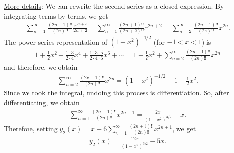 \documentclass[12pt]{article}
\begin{document}
	
	\underline{More details}: We can rewrite the second series as a closed expression. By integrating terms-by-terms, we get
		\begin{align*}
		\sum_{n = 1}^\infty \frac{(2n + 1)!!}{(2n)!!} \frac{x^{2n + 2}}{2n + 2} = \sum_{n = 1}^\infty \frac{(2n + 1)!!}{(2n + 2)!!} x^{2n + 2} = \sum_{n = 2}^\infty \frac{(2n - 1)!!}{(2n)!!} x^{2n} .
		\end{align*}
	The power series representation of $(1 - x^2)^{-1/2}$ (for $-1 < x < 1$) is
		\begin{align*}
		1 + \frac{1}{2}x^2 + \frac{1 \cdot 3}{2 \cdot 4} x^4 + \frac{1 \cdot 3 \cdot 5}{2 \cdot 4 \cdot 6} x^6 + \cdots = 1 + \frac{1}{2} x^2 + \sum_{n = 2}^\infty \frac{(2n - 1)!!}{(2n)!!} x^{2n}
		\end{align*}
	and therefore, we obtain
		\begin{align*}
		\sum_{n = 2}^\infty \frac{(2n - 1)!!}{(2n)!!} x^{2n} = (1 - x^2)^{-1/2} - 1 - \frac{1}{2} x^2 .
		\end{align*}
	Since we took the integral, undoing this process is differentiation. So, after differentiating, we obtain
		\begin{align*}
		\sum_{n = 1}^\infty  \frac{(2n + 1)!!}{(2n)!!} x^{2n + 1} = \frac{2x}{(1 - x^2)^{3/2}} - x .
		\end{align*}
	Therefore, setting $y_2 (x) = x + 6 \sum_{n= 1}^\infty \frac{(2n + 1)!!}{(2n)!!} x^{2n + 1}$, we get
		\begin{align*}
		y_2(x) = \frac{12x}{(1 - x^2)^{3/2}} - 5x .
		\end{align*}
	
\end{document}
